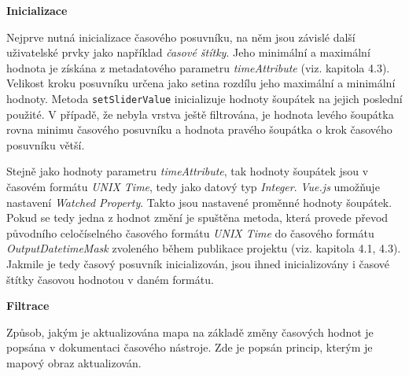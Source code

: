 \bigskip
\noindent \textbf{Inicializace}

Nejprve nutná inicializace časového posuvníku, na něm jsou závislé další uživatelské prvky jako například \textit{časové štítky}. Jeho minimální a maximální hodnota je získána z metadatového parametru \textit{timeAttribute} (viz. kapitola 4.3). Velikost kroku posuvníku určena jako setina rozdílu jeho maximální a minimální hodnoty. Metoda \verb|setSliderValue| inicializuje hodnoty šoupátek na jejich poslední použité. V případě, že nebyla vrstva ještě filtrována, je hodnota levého šoupátka rovna minimu časového posuvníku a hodnota pravého šoupátka o krok časového posuvníku větší. 

Stejně jako hodnoty parametru \textit{timeAttribute}, tak hodnoty šoupátek jsou v časovém formátu \textit{UNIX Time}, tedy jako datový typ \textit{Integer}. \textit{Vue.js} umožňuje nastavení \textit{Watched Property}. Takto jsou nastavené proměnné hodnoty šoupátek. Pokud se tedy jedna z hodnot změní je spuštěna metoda, která provede převod původního celočíselného časového formátu \textit{UNIX Time} do časového formátu \textit{OutputDatetimeMask} zvoleného během publikace projektu (viz. kapitola 4.1, 4.3). Jakmile je tedy časový posuvník inicializován, jsou ihned inicializovány i časové štítky časovou hodnotou v daném formátu.

\bigskip
\noindent \textbf{Filtrace}


Způsob, jakým je aktualizována mapa na základě změny časových hodnot je popsána v dokumentaci časového nástroje. Zde je popsán princip, kterým je mapový obraz aktualizován.

